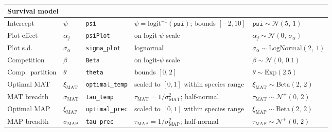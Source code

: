 \begin{longtable}{@{}p{2.1cm} p{2.1cm} p{2.1cm} p{4.3cm} p{3.6cm}@{}}
\multicolumn{5}{l}{\textbf{Survival model}}\\
\midrule
Intercept & $\bar{\psi}$ & \texttt{psi} & $\bar{\psi}=\mathrm{logit}^{-1}(\texttt{psi})$; bounds $[-2,10]$ & $\texttt{psi}\sim\mathcal{N}(5,\,1)$ \\
Plot effect & $\alpha_{j}$ & \texttt{psiPlot} & on logit-$\psi$ scale & $\alpha_{j}\sim\mathcal{N}(0,\,\sigma_{\alpha})$ \\
Plot s.d. & $\sigma_{\alpha}$ & \texttt{sigma\_plot} & lognormal & $\sigma_{\alpha}\sim\mathrm{LogNormal}(2,\,1)$ \\
Competition & $\beta$ & \texttt{Beta} & on logit-$\psi$ scale & $\beta\sim\mathcal{N}(0,\,0.1)$ \\
Comp.\ partition & $\theta$ & \texttt{theta} & bounds $[0,2]$ & $\theta\sim\mathrm{Exp}(2.5)$ \\
Optimal MAT & $\xi_{\mathrm{MAT}}$ & \texttt{optimal\_temp} & scaled to $[0,1]$ within species range & $\xi_{\mathrm{MAT}}\sim\mathrm{Beta}(2,\,2)$ \\
MAT breadth & $\sigma_{\mathrm{MAT}}$ & \texttt{tau\_temp} & $\tau_{\mathrm{MAT}}=1/\sigma_{\mathrm{MAT}}^{2}$; half-normal & $\tau_{\mathrm{MAT}}\sim\mathcal{N}^{+}(0,\,2)$ \\
Optimal MAP & $\xi_{\mathrm{MAP}}$ & \texttt{optimal\_prec} & scaled to $[0,1]$ within species range & $\xi_{\mathrm{MAP}}\sim\mathrm{Beta}(2,\,2)$ \\
MAP breadth & $\sigma_{\mathrm{MAP}}$ & \texttt{tau\_prec} & $\tau_{\mathrm{MAP}}=1/\sigma_{\mathrm{MAP}}^{2}$; half-normal & $\tau_{\mathrm{MAP}}\sim\mathcal{N}^{+}(0,\,2)$ \\
\midrule


\end{longtable}
